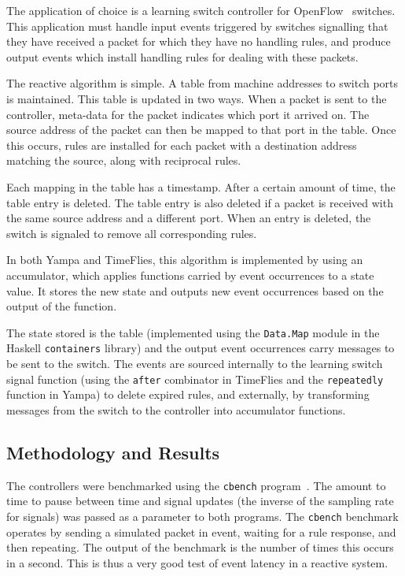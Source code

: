 The application of choice is a learning switch controller for OpenFlow~\cite{OpenflowSpec}
switches. This application must handle input events triggered by switches
signalling that they have received a packet for which they have no handling
rules, and produce output events which install handling rules for dealing with
these packets.

The reactive algorithm is simple. A table from machine addresses to switch ports
is maintained. This table is updated in two ways. When a packet is sent to the
controller, meta-data for the packet indicates which port it arrived on. The
source address of the packet can then be mapped to that port in the table.
Once this occurs, rules are installed for each packet with a destination address
matching the source, along with reciprocal rules.

Each mapping in the table has a timestamp. After a certain amount of time, the
table entry is deleted. The table entry is also deleted if a packet is received
with the same source address and a different port. When an entry is deleted,
the switch is signaled to remove all corresponding rules.

In both Yampa and TimeFlies, this algorithm is implemented by using an accumulator,
which applies functions carried by event occurrences to a state value. It stores
the new state and outputs new event occurrences based on the output of the function.

The state stored is the table (implemented using the {\tt Data.Map} module in the
Haskell {\tt containers} library) and the output event occurrences carry messages
to be sent to the switch. The events are sourced internally to the learning
switch signal function (using the {\tt after} combinator in TimeFlies and the {\tt repeatedly}
function in Yampa) to delete expired rules, and externally, by transforming messages
from the switch to the controller into accumulator functions.

\subsection{Methodology and Results}
\label{subsection:Evaluation_and_Comparisons-Methodology_and_Results}

The controllers were benchmarked using the {\tt cbench} program~\cite{cbench}. The
amount to time to pause between time and signal updates (the inverse of the sampling rate for signals)
was passed as a parameter to both programs. The {\tt cbench} benchmark operates by sending a simulated packet in
event, waiting for a rule response, and then repeating. The output of the benchmark
is the number of times this occurs in a second. This is thus a very good test of
event latency in a reactive system.

